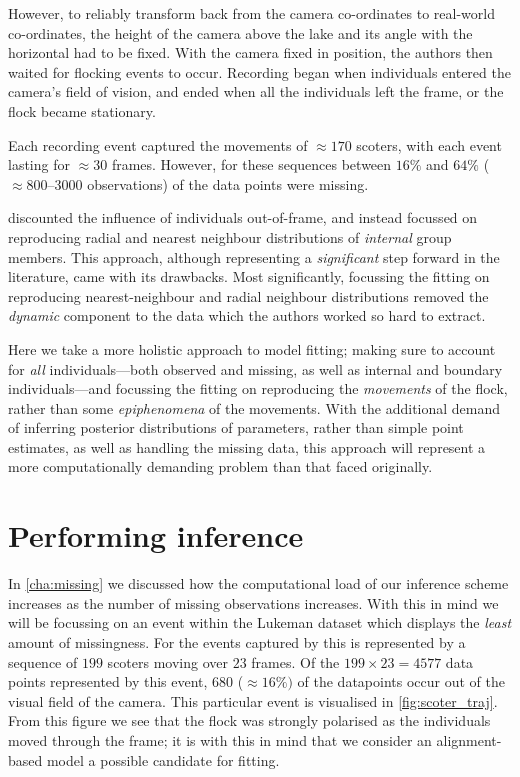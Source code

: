 However, to reliably transform back from the camera co-ordinates to real-world
co-ordinates, the height of the camera above the lake and its angle with the
horizontal had to be fixed. With the camera fixed in position, the authors then
waited for flocking events to occur. Recording began when individuals entered
the camera's field of vision, and ended when all the individuals left the
frame, or the flock became stationary.

Each recording event captured the movements of $\approx170$ scoters, with each
event lasting for $\approx30$ frames. However, for these sequences between
$16\%$ and $64\%$ ($\approx800$--$3000$ observations)
of the data points were missing.

\textcite{lukeman10} discounted the influence of individuals out-of-frame, and
instead focussed on reproducing radial and nearest neighbour distributions of
\emph{internal} group members. This approach, although representing a
\emph{significant} step forward in the literature, came with its drawbacks.
Most significantly, focussing the fitting on reproducing nearest-neighbour and
radial neighbour distributions removed the \emph{dynamic} component to the data
which the authors worked so hard to extract.

Here we take a more holistic approach to model fitting; making sure to account
for \emph{all} individuals---both observed and missing, as well as internal and
boundary individuals---and focussing the fitting on reproducing the
\emph{movements} of the flock, rather than some \emph{epiphenomena} of
the movements. With the additional demand of inferring posterior distributions
of parameters, rather than simple point estimates, as well as handling the
missing data, this approach will represent a more computationally demanding
problem than that faced originally.

\section{Performing inference}

In \cref{cha:missing} we discussed how the computational load of our inference
scheme increases as the number of missing observations increases. With this in
mind we will be focussing on an event within the Lukeman dataset which displays
the \emph{least} amount of missingness. For the events captured by
\textcite{lukeman10} this is represented by a sequence of $199$ scoters moving
over $23$ frames. Of the $199\times23=4577$ data points represented by this
event, $680$ ($\approx16\%)$ of the datapoints occur out of the visual field of
the camera. This particular event is visualised in \cref{fig:scoter_traj}. From
this figure we see that the flock was strongly polarised as the individuals
moved through the frame; it is with this in mind that we consider an
alignment-based model a possible candidate for fitting.

